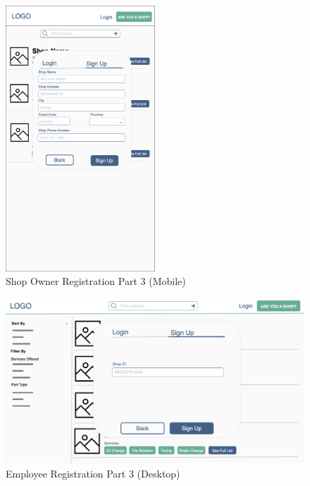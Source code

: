 \documentclass[12pt, titlepage]{article}
\begin{document}
\begin{figure}[H]
	\centering
	\includegraphics[width=0.5\textwidth]{mockups/Shop Owner Signup (Part 2) (Mobile).png}
	\caption{Shop Owner Registration \textemdash{} Part 3 (Mobile)}
\end{figure}

\begin{figure}[H]
	\centering
	\includegraphics[width=\textwidth]{mockups/Employee Signup (Part 2) (Desktop).png}
	\caption{Employee Registration \textemdash{} Part 3 (Desktop)}
\end{figure}
\end{document}
